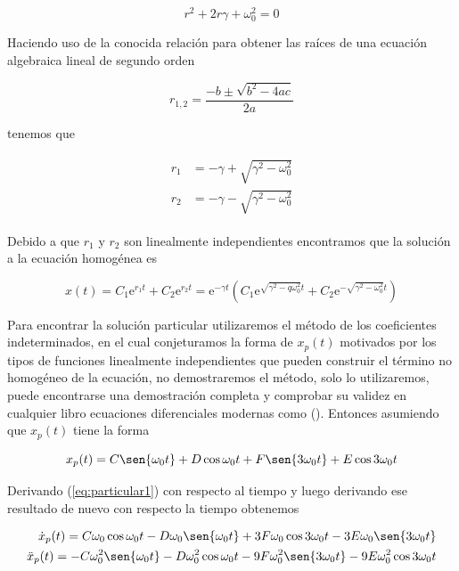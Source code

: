 \documentclass[a4paper,10pt]{article}
\newcommand{\euler}{\mathrm{e}}
\begin{document}
\begin{equation}
  r^2 + 2r\gamma + \omega_0^2 = 0
 \label{eq:ecuacionCaracteristica1}
\end{equation}

Haciendo uso de la conocida relación para obtener las raíces de una ecuación
algebraica lineal de segundo orden

$$
r_{1,2} = \frac{-b \pm \sqrt{b^2-4ac}}{2a}
$$

tenemos que 

\begin{align}
\begin{split}
%
r_1 &= - \gamma + \sqrt{\gamma^2 - \omega_0^2} \\
%
r_2 &= - \gamma - \sqrt{\gamma^2 - \omega_0^2}
%
\end{split}
\end{align}

Debido a que $r_1$ y $r_2$ son linealmente independientes encontramos que la solución
a la ecuación homogénea es 

\begin{equation}
 x(t) = C_1 \euler^{r_1 t} + C_2 \euler^{r_2 t} = \euler^{-\gamma t} (C_1 \euler^{\sqrt{\gamma^2 -q \omega_0^2}t}
 + C_2 \euler^{-\sqrt{\gamma^2 - \omega_0^2}t})
\end{equation}

Para encontrar la solución particular utilizaremos el método de los coeficientes indeterminados, 
en el cual conjeturamos la forma de $x_p (t)$ motivados por los tipos de funciones linealmente
independientes que pueden construir el término no homogéneo de la ecuación, no demostraremos
el método, solo lo utilizaremos, puede encontrarse una demostración completa y comprobar
su validez en cualquier libro ecuaciones diferenciales modernas como (\cite{zill}). Entonces
asumiendo que $x_p (t)$ tiene la forma

\begin{equation}
 x_p (t) = C \sen{\omega_0t} + D \cos{\omega_0t} + F \sen{3 \omega_0t} + E \cos{3 \omega_0t}
 \label{eq:particular1}
\end{equation}

Derivando (\ref{eq:particular1}) con respecto al tiempo y luego derivando ese resultado de nuevo
con respecto la tiempo obtenemos

\begin{align}
 \begin{split}
  \dot{x}_p (t) = C \omega_0 \cos{\omega_0t} - D\omega_0 \sen{\omega_0t} + 
  3F\omega_0 \cos{3 \omega_0t} - 3E\omega_0 \sen{3 \omega_0t} \\
  \ddot{x}_p (t) = - C\omega_0^2 \sen{\omega_0t} - D\omega_0^2 \cos{\omega_0t} - 
  9F\omega_0^2 \sen{3 \omega_0t} - 9E\omega_0^2 \cos{3 \omega_0t} 
  \label{eq:particular2}
 \end{split}
\end{align}
\end{document}

